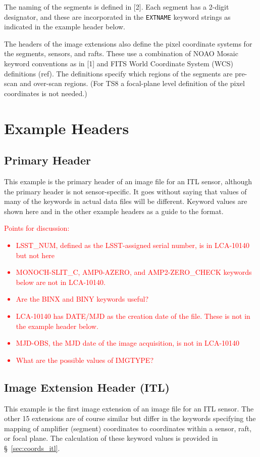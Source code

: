 \documentclass{article}[12pt]
\newcommand{\red}{\textcolor{red}}
\begin{document}
The naming of the segments is defined in [2].  Each segment has a 2-digit designator, and these are incorporated in the {\tt EXTNAME} keyword strings as indicated in the example header below.

The headers of the image extensions also define the pixel coordinate systems for the segments, sensors, and rafts.  These use a combination of NOAO Mosaic keyword conventions as in [1] and FITS World Coordinate System (WCS) definitions (ref).  The definitions specify which regions of the segments are pre-scan and over-scan regions.  (For TS8 a focal-plane level definition of the pixel coordinates is not needed.)

\section{Example Headers}

\subsection{Primary Header}
This example is the primary header of an image file for an ITL sensor, although the primary header is not sensor-specific.  It goes without saying that values of many of the keywords in actual data files will be different.  Keyword values are shown here and in the other example headers as a guide to the format.

\red{
Points for discussion:
\begin{itemize}
\item{LSST\_NUM, defined as the LSST-assigned serial number, is in LCA-10140 but not here}
\item{MONOCH-SLIT\_C, AMP0-AZERO, and AMP2-ZERO\_CHECK keywords below are not in LCA-10140.}
\item{Are the BINX and BINY keywords useful?}
\item{LCA-10140 has DATE/MJD as the creation date of the file.  These is not in the example header below.}
\item{MJD-OBS, the MJD date of the image acquisition, is not in LCA-10140}
\item{What are the possible values of IMGTYPE?}
\end{itemize}
}


\begin{alltt}

\end{alltt}

\subsection{Image Extension Header (ITL)}
This example is the first image extension of an image file for an ITL sensor.  The other 15 extensions are of course similar but differ in the keywords specifying the mapping of amplifier (segment) coordinates to coordinates within a sensor, raft, or focal plane.  The calculation of these keyword values is provided in \S~\ref{sec:coords_itl}.
\end{document}
